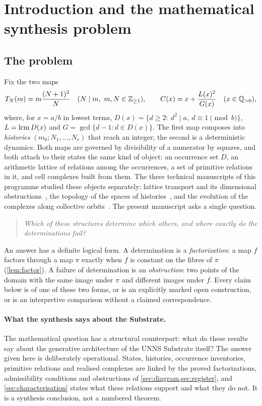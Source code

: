 \section{Introduction and the mathematical synthesis problem}\label{sec:intro}
\subsection{The problem}
Fix the two maps
\[
T_N(m)=m\frac{(N+1)^2}{N}\quad(N\mid m,\ m,N\in\Z_{\ge1}),\qquad C(x)=x+\frac{L(x)^2}{G(x)}\quad(x\in\Q_{>0}),
\]
where, for $x=a/b$ in lowest terms, $D(x)=\{d\ge2:\ d^2\mid a,\ d\equiv1\pmod b\}$, $L=\operatorname{lcm} D(x)$ and $G=\gcd\{d-1:d\in D(x)\}$. The first map composes into \emph{histories} $(m_0;N_1,\dots,N_r)$ that reach an integer; the second is a deterministic dynamics. Both maps are governed by divisibility of a numerator by squares, and both attach to their states the same kind of object: an occurrence set $D$, an arithmetic lattice of relations among the occurrences, a set of primitive relations in it, and cell complexes built from them. The three technical manuscripts of this programme studied these objects separately: lattice transport and its dimensional obstructions~\cite{PaperI}, the topology of the spaces of histories~\cite{PaperII}, and the evolution of the complexes along collective orbits~\cite{PaperIII}. The present manuscript asks a single question.

\begin{quote}\emph{Which of these structures determine which others, and where exactly do the determinations fail?}
\end{quote}

An answer has a definite logical form. A determination is a \emph{factorization}: a map $f$ factors through a map $\pi$ exactly when $f$ is constant on the fibres of $\pi$ (\cref{lem:factor}). A failure of determination is an \emph{obstruction}: two points of the domain with the same image under $\pi$ and different images under $f$. Every claim below is of one of these two forms, or is an explicitly marked open construction, or is an interpretive comparison without a claimed correspondence.

\paragraph{What the synthesis says about the Substrate.} The mathematical question has a structural counterpart: what do these results say about the generative architecture of the UNNS Substrate itself? The answer given here is deliberately operational. States, histories, occurrence inventories, primitive relations and realised complexes are linked by the proved factorizations, admissibility conditions and obstructions of \cref{sec:diagram,sec:register}, and \cref{sec:characterisation} states what these relations support and what they do not. It is a synthesis conclusion, not a numbered theorem.

